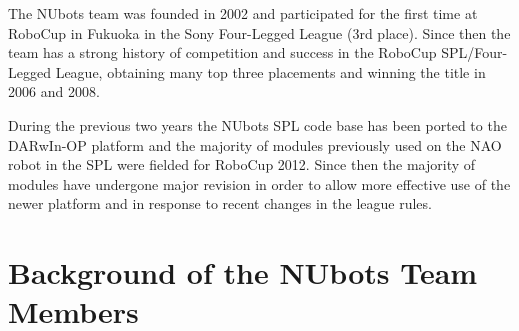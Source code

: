 \documentclass{llncs}
\begin{document}
The NUbots team was founded in 2002 and participated for the first time at RoboCup in Fukuoka in the Sony Four-Legged League (3rd place). Since then the team has  a strong history of competition and success in the RoboCup SPL/Four-Legged League, obtaining many top three placements and winning the title in 2006 and 2008.

During the previous two years the NUbots SPL code base has been ported to the DARwIn-OP platform and the majority of modules previously used on the NAO robot in the SPL were fielded for RoboCup 2012. Since then the majority of modules have undergone major revision in order to allow more effective use of the newer platform and in response to recent changes in the league rules. 

\section{Background of the NUbots Team Members}
\end{document}
